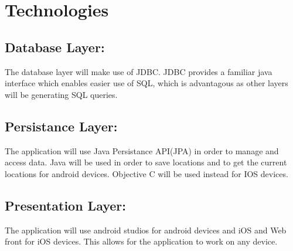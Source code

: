 \documentclass[11pt]{article}
\begin{document}
\section{Technologies}
\subsection{Database Layer:}
	The database layer will make use of JDBC. JDBC provides a familiar java interface which enables easier use of SQL, which is 		advantagous as other layers will be generating SQL queries.
\subsection{Persistance Layer:}
	The application will use Java Persistance API(JPA) in order to manage and access data.
	Java will be used in order to save locations and to get the current locations for android devices.
	Objective C will be used instead for IOS devices.
\subsection{Presentation Layer:}
	The application will use android studios for android devices and iOS and Web front for iOS devices. This allows for the 		application to work on any device.
\end{document}
